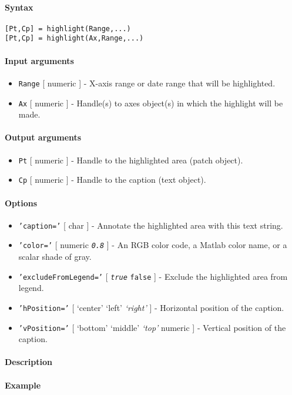 


	\paragraph{Syntax}

\begin{verbatim}
[Pt,Cp] = highlight(Range,...)
[Pt,Cp] = highlight(Ax,Range,...)
\end{verbatim}

\paragraph{Input arguments}

\begin{itemize}
\item
  \texttt{Range} {[} numeric {]} - X-axis range or date range that will
  be highlighted.
\item
  \texttt{Ax} {[} numeric {]} - Handle(s) to axes object(s) in which the
  highlight will be made.
\end{itemize}

\paragraph{Output arguments}

\begin{itemize}
\item
  \texttt{Pt} {[} numeric {]} - Handle to the highlighted area (patch
  object).
\item
  \texttt{Cp} {[} numeric {]} - Handle to the caption (text object).
\end{itemize}

\paragraph{Options}

\begin{itemize}
\item
  \texttt{'caption='} {[} char {]} - Annotate the highlighted area with
  this text string.
\item
  \texttt{'color='} {[} numeric \textbar{} \emph{\texttt{0.8}} {]} - An
  RGB color code, a Matlab color name, or a scalar shade of gray.
\item
  \texttt{'excludeFromLegend='} {[} \emph{\texttt{true}} \textbar{}
  \texttt{false} {]} - Exclude the highlighted area from legend.
\item
  \texttt{'hPosition='} {[} `center' \textbar{} `left' \textbar{}
  \emph{`right'} {]} - Horizontal position of the caption.
\item
  \texttt{'vPosition='} {[} `bottom' \textbar{} `middle' \textbar{}
  \emph{`top'} \textbar{} numeric {]} - Vertical position of the
  caption.
\end{itemize}

\paragraph{Description}

\paragraph{Example}


